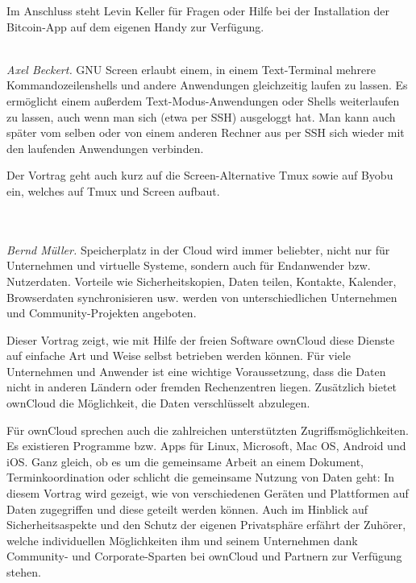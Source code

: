 \documentclass[10pt,a4paper,ngerman,landscape]{scrartcl}
\let\origdescription\description
\renewenvironment{description}{
  \setlength{\leftmargini}{0em}
  \origdescription
  \setlength{\itemindent}{0em}
  \setlength{\itemsep}{1.2em}
  \setlength{\labelsep}{\textwidth}
}
{\endlist}
\newcommand{\vorschub}{\mbox{}\\[-0.5em]}
\begin{document}
\begin{multicols}{3}
\begin{description}
Im Anschluss steht Levin Keller für Fragen oder Hilfe bei der
Installation der Bitcoin-App auf dem eigenen Handy zur Verfügung.




\item[Mehrere Terminals in einem mit GNU Screen]\vorschub
\textsl{Axel Beckert.}
GNU Screen erlaubt einem, in einem Text-Terminal mehrere Kommandozeilenshells
und andere Anwendungen gleichzeitig laufen zu lassen. Es ermöglicht einem
außerdem Text-Modus-Anwendungen oder Shells weiterlaufen zu lassen, auch wenn
man sich (etwa per SSH) ausgeloggt hat. Man kann auch später vom selben oder
von einem anderen Rechner aus per SSH sich wieder mit den laufenden Anwendungen
verbinden.

Der Vortrag geht auch kurz auf die Screen-Alternative Tmux sowie auf Byobu ein,
welches auf Tmux und Screen aufbaut.

\item[{\parbox[t]{\linewidth}{Sichere und unabhängige Datenverwaltung mit ownCloud}}]\vorschub\\
\textsl{Bernd Müller.}
Speicherplatz in der Cloud wird immer beliebter, nicht nur für Unternehmen
und virtuelle Systeme, sondern auch für Endanwender bzw. Nutzerdaten. Vorteile
wie Sicherheitskopien, Daten teilen, Kontakte, Kalender, Browserdaten
synchronisieren usw. werden von unterschiedlichen Unternehmen und
Community-Projekten angeboten.

Dieser Vortrag zeigt, wie mit Hilfe der freien Software ownCloud diese Dienste
auf einfache Art und Weise selbst betrieben werden können. Für viele
Unternehmen und Anwender ist eine wichtige Voraussetzung, dass die Daten nicht
in anderen Ländern oder fremden Rechenzentren liegen. Zusätzlich bietet
ownCloud die Möglichkeit, die Daten verschlüsselt abzulegen.

Für ownCloud sprechen auch die zahlreichen unterstützten Zugriffsmöglichkeiten.
Es existieren Programme bzw. Apps für Linux, Microsoft, Mac OS, Android und
iOS. Ganz gleich, ob es um die gemeinsame Arbeit an einem Dokument,
Terminkoordination oder schlicht die gemeinsame Nutzung von Daten geht: In
diesem Vortrag wird gezeigt, wie von verschiedenen Geräten und Plattformen auf
Daten zugegriffen und diese geteilt werden können. Auch im Hinblick auf
Sicherheitsaspekte und den Schutz der eigenen Privatsphäre erfährt der Zuhörer,
welche individuellen Möglichkeiten ihm und seinem Unternehmen dank Community-
und Corporate-Sparten bei ownCloud und Partnern zur Verfügung stehen.
\end{description}


\end{multicols}
\end{document}
